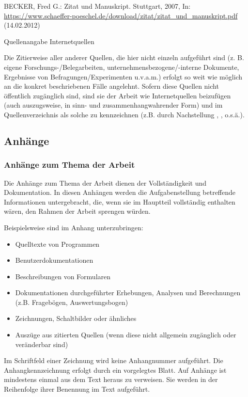 \begin{example}[H]
    \begin{framed}
        BECKER, Fred G.: Zitat und Manuskript. Stuttgart, 2007, In: \href{https://www.schaeffer-poeschel.de/download/zitat/zitat_und_manuskript.pdf}{https://www.schaeffer-poeschel.de/download/zitat/zitat\_und\_manuskript.pdf} (14.02.2012)
    \end{framed}
    \caption{Quellenangabe Internetquellen}
    \label{bsp-quelle-internetquellen}
\end{example}

Die Zitierweise aller anderer Quellen, die hier nicht einzeln aufgeführt sind (z. B. eigene Forschungs-/Belegarbeiten, unternehmensbezogene/-interne Dokumente, Ergebnisse von Befragungen/Experimenten u.v.a.m.) erfolgt so weit wie möglich an die konkret beschriebenen Fälle angelehnt.
Sofern diese Quellen nicht öffentlich zugänglich sind, sind sie der Arbeit wie Internetquellen beizufügen (auch auszugsweise, in sinn- und zusammenhangwahrender Form) und im Quellenverzeichnis als solche zu kennzeichnen (z.B. durch Nachstellung , , o.s.ä.).

\subsection{Anhänge}
\label{formal-gestaltung-anhaenge}
\subsubsection{Anhänge zum Thema der Arbeit}
\label{formal-gestaltung-anhaenge-anhaenge}
Die Anhänge zum Thema der Arbeit dienen der Vollständigkeit und Dokumentation.
In diesen Anhängen werden die Aufgabenstellung betreffende Informationen untergebracht, die, wenn sie im Hauptteil vollständig enthalten wären, den Rahmen der Arbeit sprengen würden.

Beispielsweise sind im Anhang unterzubringen:
\begin{itemize}
    \item Quelltexte von Programmen
    \item Benutzerdokumentationen
    \item Beschreibungen von Formularen
    \item Dokumentationen durchgeführter Erhebungen, Analysen und Berechnungen (z.B. Fragebögen, Auswertungsbogen)
    \item Zeichnungen, Schaltbilder oder ähnliches
    \item Auszüge aus zitierten Quellen (wenn diese nicht allgemein zugänglich oder veränderbar sind)
\end{itemize}
Im Schriftfeld einer Zeichnung wird keine Anhangnummer aufgeführt.
Die Anhangkennzeichnung erfolgt durch ein vorgelegtes Blatt.
Auf Anhänge ist mindestens einmal aus dem Text heraus zu verweisen.
Sie werden in der Reihenfolge ihrer Benennung im Text aufgeführt.

